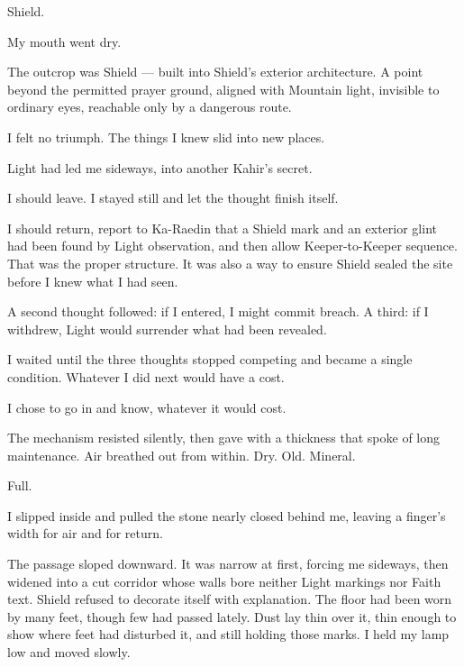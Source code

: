 Shield.\par

My mouth went dry.\par

The outcrop was Shield --- built into Shield's exterior architecture. A point beyond the permitted prayer ground, aligned with Mountain light, invisible to ordinary eyes, reachable only by a dangerous route.\par

I felt no triumph. The things I knew slid into new places.\par

Light had led me sideways, into another Kahir's secret.\par

I should leave. I stayed still and let the thought finish itself.\par

I should return, report to Ka-Raedin that a Shield mark and an exterior glint had been found by Light observation, and then allow Keeper-to-Keeper sequence. That was the proper structure. It was also a way to ensure Shield sealed the site before I knew what I had seen.\par

A second thought followed: if I entered, I might commit breach. A third: if I withdrew, Light would surrender what had been revealed.\par

I waited until the three thoughts stopped competing and became a single condition. Whatever I did next would have a cost.\par

I chose to go in and know, whatever it would cost.\par

The mechanism resisted silently, then gave with a thickness that spoke of long maintenance. Air breathed out from within. Dry. Old. Mineral.\par

Full.\par

I slipped inside and pulled the stone nearly closed behind me, leaving a finger's width for air and for return.\par

The passage sloped downward. It was narrow at first, forcing me sideways, then widened into a cut corridor whose walls bore neither Light markings nor Faith text. Shield refused to decorate itself with explanation. The floor had been worn by many feet, though few had passed lately. Dust lay thin over it, thin enough to show where feet had disturbed it, and still holding those marks. I held my lamp low and moved slowly.\par

